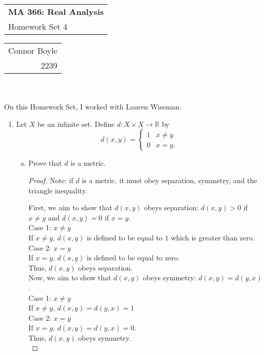 \documentclass{amsart}
\def\name{Connor Boyle} %
\def\CM{2239} %
\def\hwnum{4} %
\begin{document}
\noindent
\thispagestyle{firststyle}
\begin{tabular}{l}
{\LARGE \textbf{MA 366: Real Analysis} }\\
{\Large Homework Set \hwnum}
\end{tabular} \hfill \begin{tabular}{r}
                        \name \\
                        \CM
                        \end{tabular}

\noindent \hrulefill \\\\
On this Homework Set, I worked with Lauren Wiseman.\\
\begin{enumerate}[1.]
    \item Let $X$ be an infinite set. Define $d: X \times X \to \mathbb{R}$ by
    \[ d(x,y) = \begin{cases} 1 &  x \neq y \\ 
                              0 &  x = y. 
                \end{cases}
    \]
    \begin{enumerate}[(a)]
    \item Prove that $d$ is a metric.

\begin{proof}
Note: if $d$ is a metric, it must obey separation, symmetry, and the
triangle inequality.

First, we aim to show that $d(x,y)$ obeys separation: $d(x,y) > 0$ if
$x \neq y$ and $d(x,y) = 0$ if $x = y$.\\

Case 1: $x \neq y$\\
If $x \neq y$, $d(x,y)$ is defined to be equal to $1$ which is greater than zero.\\

Case 2: $x = y$ \\
If $x = y$, $d(x,y)$ is defined to be equal to zero. \\
Thus, $d(x,y)$ obeys separation. \\

Now, we aim to show that $d(x,y)$ obeys symmetry: $d(x,y) = d(y,x)$. \\

Case 1: $x \neq y$\\
If $x \neq y$, $d(x,y) = d(y,x) = 1$ \\

Case 2: $x = y$\\
If $x = y$, $d(x,y) = d(y,x) = 0$.\\
Thus, $d(x,y)$ obeys symmetry. \\


\end{proof}
\end{enumerate}
\end{enumerate}
\end{document}
